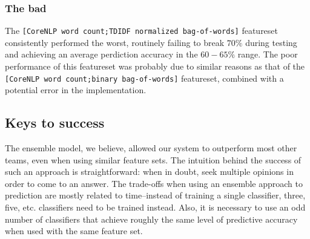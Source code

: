 \documentclass[
10pt, %
a4paper, %
oneside, %
headinclude,footinclude, %
BCOR5mm, %
]{scrartcl}
\begin{document}
\subsubsection{The bad}
The \texttt{[CoreNLP word count;TDIDF normalized bag-of-words]} featureset
consistently performed the worst, routinely failing to break $70\%$ during
testing and achieving an average perdiction accuracy in the $60-65\%$ range. The
poor performance of this featureset was probably due to similar reasons as that
of the \texttt{[CoreNLP word count;binary bag-of-words]} featureset, combined
with a potential error in the implementation.

\subsection{Keys to success}

The ensemble model, we believe, allowed our system to outperform most other 
teams, even when using similar feature sets. The intuition behind the success 
of such an approach is straightforward: when in doubt, seek multiple opinions in
order to come to an answer. The trade-offs when using an ensemble approach to
prediction are mostly related to time--instead of training a single classifier,
three, five, etc. classifiers need to be trained instead. Also, it is necessary
to use an odd number of classifiers that achieve roughly the same level of
predictive accuracy when used with the same feature set.
\end{document}
